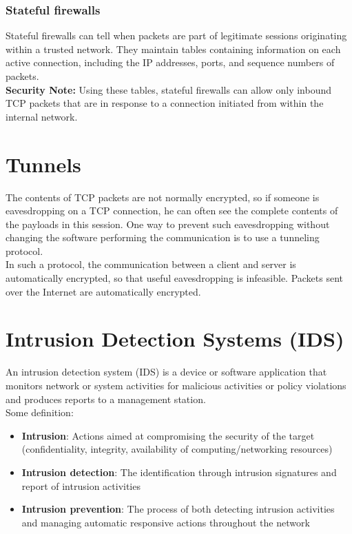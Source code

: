 \subsubsection{Stateful firewalls}
Stateful firewalls can tell when packets are part of legitimate sessions originating within a trusted network. They
maintain tables containing information on each active connection, including the IP addresses, ports, and sequence numbers of packets.\\
\textbf{Security Note:} Using these tables, stateful firewalls can allow only inbound TCP packets that are in response to a connection initiated from within the internal network.
\section{Tunnels}
The contents of TCP packets are not normally encrypted, so if someone is eavesdropping on a TCP connection, he can often see the complete contents of the payloads in this session. One way to prevent such eavesdropping without
changing the software performing the communication is to use a tunneling protocol.\\
In such a protocol, the communication between a client and server is automatically encrypted, so that useful eavesdropping is infeasible. Packets sent over the Internet are automatically encrypted.
\section{Intrusion Detection Systems (IDS)}
An intrusion detection system (IDS) is a device or software application that monitors network or system activities for malicious activities or policy violations and produces reports to a management station. \\
Some definition:
\begin{itemize}
\item \textbf{Intrusion}: Actions aimed at compromising the security of the target (confidentiality, integrity, availability of computing/networking resources)
\item \textbf{Intrusion detection}: The identification through intrusion signatures and report of intrusion activities
\item \textbf{Intrusion prevention}: The process of both detecting intrusion activities and managing automatic responsive actions throughout the network
\end{itemize}
